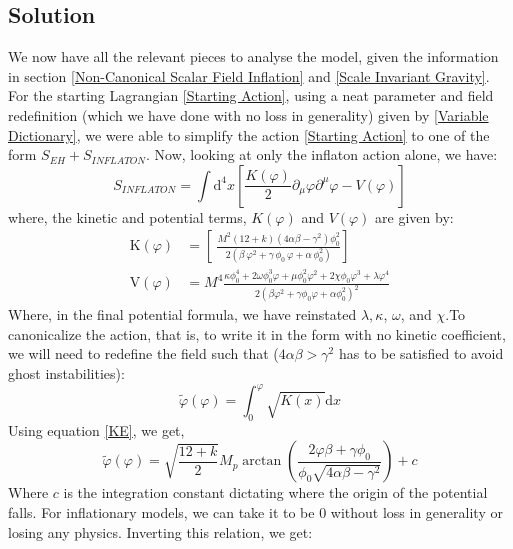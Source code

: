 \documentclass[aps,prd,reprint,preprintnumbers,showpacs,floatfix,nofootinbib,superscript address]{revtex4-2}
\begin{document}
\subsection{Solution} \label{Solution}
We now have all the relevant pieces to analyse the model, given the information in section \ref{Non-Canonical Scalar Field Inflation}  and \ref{Scale Invariant Gravity}. For the starting Lagrangian \ref{Starting Action}, using a neat parameter and field redefinition (which we have done with no loss in generality) given by \ref{Variable Dictionary}, we were able to simplify the action \ref{Starting Action} to one of the form $S_{EH} + S_{INFLATON}$. Now, looking at only the inflaton action alone, we have: 
\begin{equation}
    S_{INFLATON} = \int \text{d}^4x \left[ \frac{K(\varphi)}{2} \partial_\mu \varphi \partial^\mu \varphi - V(\varphi)\right]
\end{equation}
where, the kinetic and potential terms, $K(\varphi)$ and $V(\varphi)$ are given by:
\begin{align}
    \text{K}(\varphi) &= \left[\ \frac{M^2(12+k)(4\alpha\beta-\gamma^2) \phi_0^2}{2(\beta\,\varphi^2 + \gamma\,\phi_0\,\varphi + \alpha\,\phi_0^2)} \right] \label{KE} \\
    \text{V}(\varphi) &= M^4  \frac{ \kappa \phi_0^4 + 2\omega \phi_0^3 \varphi +\mu \phi^2_0 \varphi^2 + 2\chi \phi_0 \varphi^3 + \lambda \varphi^4 }{2(\beta \varphi^2 + \gamma\phi_0\varphi + \alpha \phi_0^2)^2} \label{VE}
\end{align}
Where, in the final potential formula, we have reinstated $\lambda, \kappa$, $\omega$, and $\chi$.To canonicalize the action, that is, to write it in the form with no kinetic coefficient, we will need to redefine the field such that ($4\alpha \beta > \gamma^2$ has to be satisfied to avoid ghost instabilities):
\begin{equation} \label{40}
    \tilde{\varphi}(\varphi) = \int_0^{\varphi} \sqrt{K(x)} \text{d}x
\end{equation}
Using equation \ref{KE}, we get,
\begin{equation}
    \tilde{\varphi}(\varphi) = \sqrt{\frac{12+k}{2}}M_p \arctan \left( \frac{2\varphi\beta + \gamma \phi_0}{\phi_0\sqrt{4\alpha\beta - \gamma^2}} \right) + c
\end{equation}
Where $c$ is the integration constant dictating where the origin of the potential falls. For inflationary models, we can take it to be 0 without loss in generality or losing any physics. Inverting this relation, we get:
\end{document}
